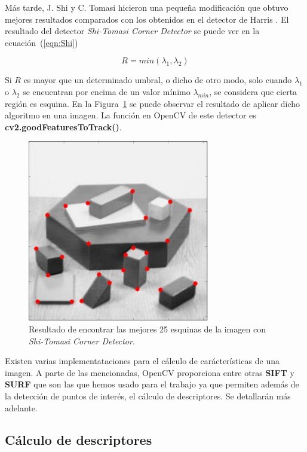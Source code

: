 Más tarde, J. Shi y C. Tomasi hicieron una pequeña modificación que obtuvo mejores resultados comparados con los obtenidos en el detector de Harris \parencite{Reference9}. El resultado del detector \textit{Shi-Tomasi Corner Detector} se puede ver en la ecuación~(\ref{eqn:Shi})

\begin{equation}
R=min(\lambda_{1},\lambda_{2})
\label{eqn:Shi}
\end{equation}

Si $R$ es mayor que un determinado umbral, o dicho de otro modo, solo cuando $\lambda_{1}$ o $\lambda_{2}$ se encuentran por encima de un valor mínimo $\lambda_{min}$, se considera que cierta región es esquina. En la Figura~\ref{fig:shi_detector} se puede observar el resultado de aplicar dicho algoritmo en una imagen. La función en OpenCV de este detector es \textbf{cv2.goodFeaturesToTrack()}.

\begin{figure}[ht]
\centering
\includegraphics[scale=0.5]{Figures/shi-detector.jpg}
\decoRule
\caption[Ejemplo con \textit{Shi-Tomasi Corner Detector}]{Resultado de encontrar las mejores 25 esquinas de la imagen con \textit{Shi-Tomasi Corner Detector}.}
\label{fig:shi_detector}
\end{figure}

Existen varias implementataciones para el cálculo de carácterísticas de una imagen. A parte de las mencionadas, OpenCV proporciona entre otras \textbf{SIFT} y \textbf{SURF} que son las que hemos usado para el trabajo ya que permiten además de la detección de puntos de interés, el cálculo de descriptores. Se detallarán más adelante.

\subsection{Cálculo de descriptores}

